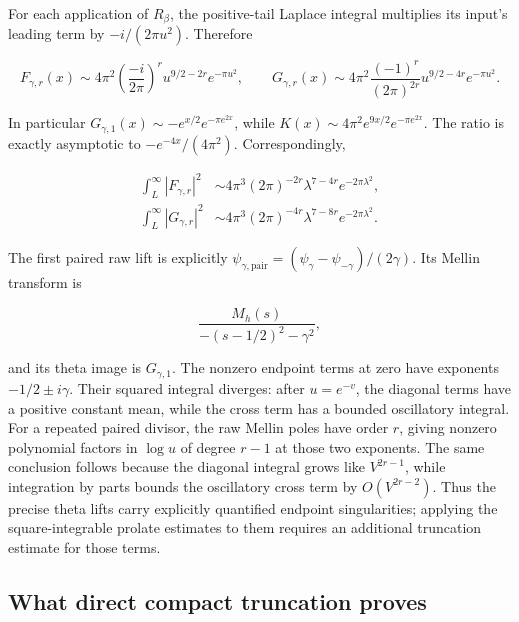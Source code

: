 For each application of $R_\beta$, the positive-tail Laplace integral multiplies its input's leading term by $-i/(2\pi u^2)$. Therefore

\begin{equation}
F_{\gamma,r}(x)\sim
   4\pi^2\left(\frac{-i}{2\pi}\right)^r
       u^{9/2-2r}e^{-\pi u^2},
 \qquad
 G_{\gamma,r}(x)\sim
   4\pi^2\frac{(-1)^r}{(2\pi)^{2r}}
       u^{9/2-4r}e^{-\pi u^2}.
 \label{eq:theta-hier-16}
\end{equation}

In particular $G_{\gamma,1}(x)\sim-e^{x/2}e^{-\pi e^{2x}}$, while $K(x)\sim4\pi^2e^{9x/2}e^{-\pi e^{2x}}$. The ratio is exactly asymptotic to $-e^{-4x}/(4\pi^2)$. Correspondingly,

\begin{equation}
\begin{aligned}
 \int_L^\infty |F_{\gamma,r}|^2
   &\sim4\pi^3(2\pi)^{-2r}\lambda^{7-4r}e^{-2\pi\lambda^2},\\
 \int_L^\infty |G_{\gamma,r}|^2
   &\sim4\pi^3(2\pi)^{-4r}\lambda^{7-8r}e^{-2\pi\lambda^2}.
\end{aligned}
 \label{eq:theta-hier-17}
\end{equation}

The first paired raw lift is explicitly
$\psi_{\gamma,\mathrm{pair}}=(\psi_\gamma-\psi_{-\gamma})/(2\gamma)$. Its Mellin transform is

\begin{equation}
\frac{M_h(s)}{-(s-1/2)^2-\gamma^2},
 \label{eq:theta-hier-18}
\end{equation}

and its theta image is $G_{\gamma,1}$. The nonzero endpoint terms at zero have exponents $-1/2\pm i\gamma$. Their squared integral diverges: after $u=e^{-v}$, the diagonal terms have a positive constant mean, while the cross term has a bounded oscillatory integral. For a repeated paired divisor, the raw Mellin poles have order $r$, giving nonzero polynomial factors in $\log u$ of degree $r-1$ at those two exponents. The same conclusion follows because the diagonal integral grows like $V^{2r-1}$, while integration by parts bounds the oscillatory cross term by $O(V^{2r-2})$. Thus the precise theta lifts carry explicitly quantified endpoint singularities; applying the square-integrable prolate estimates to them requires an additional truncation estimate for those terms.

\subsection{What direct compact truncation proves}

